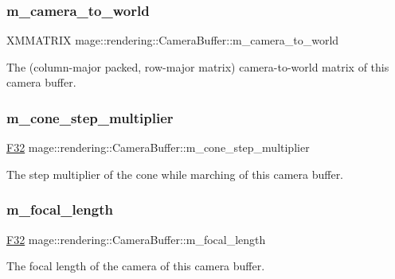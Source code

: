 \subsubsection{\texorpdfstring{m\+\_\+camera\+\_\+to\+\_\+world}{m\_camera\_to\_world}}
{\footnotesize\ttfamily X\+M\+M\+A\+T\+R\+IX mage\+::rendering\+::\+Camera\+Buffer\+::m\+\_\+camera\+\_\+to\+\_\+world}

The (column-\/major packed, row-\/major matrix) camera-\/to-\/world matrix of this camera buffer. \hypertarget{structmage_1_1rendering_1_1_camera_buffer_a802e8c4ba601b91658cb30c2f1c2cfe2}{}\label{structmage_1_1rendering_1_1_camera_buffer_a802e8c4ba601b91658cb30c2f1c2cfe2} 
\subsubsection{\texorpdfstring{m\+\_\+cone\+\_\+step\+\_\+multiplier}{m\_cone\_step\_multiplier}}
{\footnotesize\ttfamily \hyperlink{namespacemage_aa97e833b45f06d60a0a9c4fc22ae02c0}{F32} mage\+::rendering\+::\+Camera\+Buffer\+::m\+\_\+cone\+\_\+step\+\_\+multiplier}

The step multiplier of the cone while marching of this camera buffer. \hypertarget{structmage_1_1rendering_1_1_camera_buffer_a7ed5079582d476597f8bc4d6a0b3f372}{}\label{structmage_1_1rendering_1_1_camera_buffer_a7ed5079582d476597f8bc4d6a0b3f372} 
\subsubsection{\texorpdfstring{m\+\_\+focal\+\_\+length}{m\_focal\_length}}
{\footnotesize\ttfamily \hyperlink{namespacemage_aa97e833b45f06d60a0a9c4fc22ae02c0}{F32} mage\+::rendering\+::\+Camera\+Buffer\+::m\+\_\+focal\+\_\+length}

The focal length of the camera of this camera buffer. \hypertarget{structmage_1_1rendering_1_1_camera_buffer_a6f963e7d607c59ab0dfc3972e06a9739}{}\label{structmage_1_1rendering_1_1_camera_buffer_a6f963e7d607c59ab0dfc3972e06a9739} 
